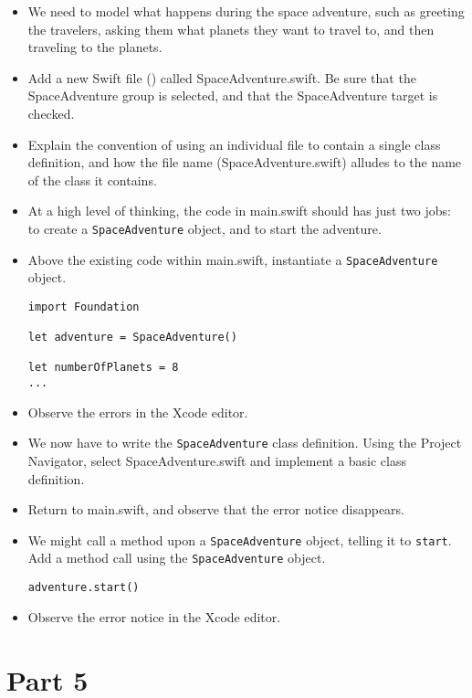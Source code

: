 \documentclass[a4paper,11pt]{scrartcl}
\begin{document}
\begin{itemize}
\item We need to model what happens during the space adventure, such as greeting the travelers, asking them what planets they want to travel to, and then traveling to the planets.
\item Add a new Swift file () called SpaceAdventure.swift. Be sure that the SpaceAdventure group is selected, and that the SpaceAdventure target is checked.
\item Explain the convention of using an individual file to contain a single class definition, and how the file name (SpaceAdventure.swift) alludes to the name of the class it contains.
\item At a high level of thinking, the code in main.swift should has just two jobs: to create a \texttt{SpaceAdventure} object, and to start the adventure.
\item Above the existing code within main.swift, instantiate a \texttt{SpaceAdventure} object.
\begin{lstlisting}
import Foundation

let adventure = SpaceAdventure()

let numberOfPlanets = 8
...
\end{lstlisting}
\item Observe the errors in the Xcode editor.
\item We now have to write the \texttt{SpaceAdventure} class definition. Using the Project Navigator, select SpaceAdventure.swift and implement a basic class definition.
\item Return to main.swift, and observe that the error notice disappears.
\item We might call a method upon a \texttt{SpaceAdventure} object, telling it to \texttt{start}. Add a method call using the \texttt{SpaceAdventure} object.
\begin{lstlisting}
adventure.start()
\end{lstlisting}
\item Observe the error notice in the Xcode editor.
\end{itemize}

\section*{Part 5}
\end{document}
